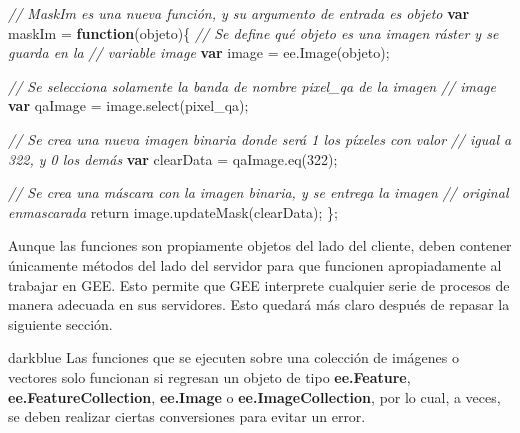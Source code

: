\documentclass[
  12pt,
  letterpaper,
  twoside]{book}
\newenvironment{Shaded}{\begin{snugshade}}{\end{snugshade}}
\newcommand{\CommentTok}[1]{\textcolor[rgb]{0.24,0.58,0.00}{\textit{#1}}}
\newcommand{\ControlFlowTok}[1]{\textcolor[rgb]{0.00,0.00,0.00}{#1}}
\newcommand{\DecValTok}[1]{\textcolor[rgb]{0.28,0.53,0.93}{#1}}
\newcommand{\FunctionTok}[1]{\textcolor[rgb]{0.48,0.12,0.64}{#1}}
\newcommand{\KeywordTok}[1]{\textcolor[rgb]{0.00,0.00,0.00}{\textbf{#1}}}
\newcommand{\NormalTok}[1]{#1}
\newcommand{\OperatorTok}[1]{\textcolor[rgb]{0.00,0.00,0.00}{#1}}
\newcommand{\StringTok}[1]{\textcolor[rgb]{0.87,0.29,0.22}{#1}}
\newcommand\boldpurple[1]{\textcolor{darkpurple}{\textbf{#1}}}
\begin{document}
\begin{Shaded}
\begin{Highlighting}[]
\CommentTok{// MaskIm es una nueva función, y su argumento de entrada es objeto}
\KeywordTok{var}\NormalTok{ maskIm }\OperatorTok{=} \KeywordTok{function}\NormalTok{(objeto)\{ }
  \CommentTok{// Se define qué objeto es una imagen ráster y se guarda en la }
  \CommentTok{// variable image}
  \KeywordTok{var}\NormalTok{ image }\OperatorTok{=}\NormalTok{ ee}\OperatorTok{.}\FunctionTok{Image}\NormalTok{(objeto)}\OperatorTok{;}
   
  \CommentTok{// Se selecciona solamente la banda de nombre \textquotesingle{}pixel\_qa\textquotesingle{} de la imagen}
  \CommentTok{// image}
  \KeywordTok{var}\NormalTok{ qaImage }\OperatorTok{=}\NormalTok{ image}\OperatorTok{.}\FunctionTok{select}\NormalTok{(}\StringTok{\textquotesingle{}pixel\_qa\textquotesingle{}}\NormalTok{)}\OperatorTok{;}
       
  \CommentTok{// Se crea una nueva imagen binaria donde será 1 los píxeles con valor }
  \CommentTok{// igual a 322, y 0 los demás}
  \KeywordTok{var}\NormalTok{ clearData }\OperatorTok{=}\NormalTok{ qaImage}\OperatorTok{.}\FunctionTok{eq}\NormalTok{(}\DecValTok{322}\NormalTok{)}\OperatorTok{;}      
      
  \CommentTok{// Se crea una máscara con la imagen binaria, y se entrega la imagen }
  \CommentTok{// original enmascarada}
  \ControlFlowTok{return}\NormalTok{ image}\OperatorTok{.}\FunctionTok{updateMask}\NormalTok{(clearData)}\OperatorTok{;}      
\NormalTok{ \}}\OperatorTok{;}
\end{Highlighting}
\end{Shaded}

Aunque las funciones son propiamente objetos del lado del cliente, deben contener únicamente métodos del lado del servidor para que funcionen apropiadamente al trabajar en GEE. Esto permite que GEE interprete cualquier serie de procesos de manera adecuada en sus servidores. Esto quedará más claro después de repasar la siguiente sección.

\begin{bluebox2}

\begin{awesomeblock}{5pt}{\faLightbulb}{darkblue}
Las funciones que se ejecuten sobre una colección de imágenes o vectores solo funcionan si regresan un objeto de tipo \boldpurple{ee.Feature}, \boldpurple{ee.FeatureCollection}, \boldpurple{ee.Image} o \boldpurple{ee.ImageCollection}, por lo cual, a veces, se deben realizar ciertas conversiones para evitar un error.

\end{awesomeblock}

\end{bluebox2}
\end{document}
